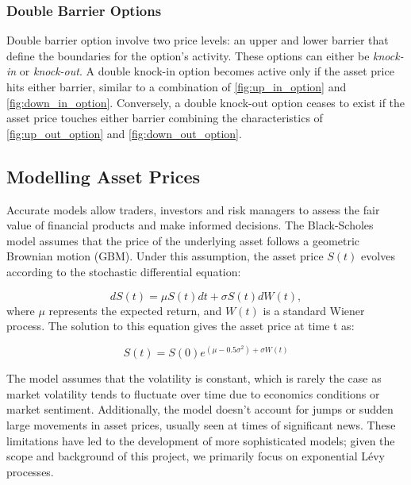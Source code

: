 \documentclass[a4paper]{report}
\begin{document}
\subsubsection{Double Barrier Options}\label{double_barrier}
Double barrier option involve two price levels: an upper and lower barrier that define the boundaries for the option's activity. These options can either be \textit{knock-in} or \textit{knock-out}. A double knock-in option becomes active only if the asset price hits either barrier, similar to a combination of \autoref{fig:up_in_option} and \autoref{fig:down_in_option}. Conversely, a double knock-out option ceases to exist if the asset price touches either barrier combining the characteristics of \autoref{fig:up_out_option} and \autoref{fig:down_out_option}.

\subsection{Modelling Asset Prices}
Accurate models allow traders, investors and risk managers to assess the fair value of financial products and make informed decisions. The Black-Scholes model assumes that the price of the underlying asset follows a geometric Brownian motion (GBM). Under this assumption, the asset price $S(t)$ evolves according to the stochastic differential equation:

\begin{equation}\label{black_scholes_equation}
dS(t) = \mu S(t) dt + \sigma S(t) dW(t),	
\end{equation}
where $\mu$ represents the expected return, and $W(t)$ is a standard Wiener process. The solution to this equation gives the asset price at time t as:

\begin{equation}
S(t) = S(0)e^{(\mu - 0.5 \sigma^2) + \sigma W(t)}	
\end{equation}

The model assumes that the volatility is constant, which is rarely the case as market volatility tends to fluctuate over time due to economics conditions or market sentiment. Additionally, the model doesn't account for jumps or sudden large movements in asset prices, usually seen at times of significant news. These limitations have led to the development of more sophisticated models; given the scope and background of this project, we primarily focus on exponential L\'evy processes.
\end{document}
